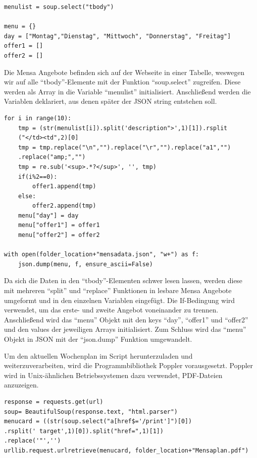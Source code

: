 \begin{lstlisting}
menulist = soup.select("tbody")

menu = {}
day = ["Montag","Dienstag", "Mittwoch", "Donnerstag", "Freitag"]
offer1 = []
offer2 = []
\end{lstlisting}

Die Mensa Angebote befinden sich auf der Webseite in einer Tabelle, weswegen wir auf alle ``tbody''-Elemente mit der Funktion ``soup.select'' zugreifen. Diese werden als Array in die Variable ``menulist'' initialisiert. Anschließend werden die Variablen deklariert, aus denen später der JSON string entstehen soll. 

\begin{lstlisting}
for i in range(10):
    tmp = (str(menulist[i]).split('description">',1)[1]).rsplit
    ("</td><td",2)[0]
    tmp = tmp.replace("\n","").replace("\r","").replace("a1","")
    .replace("amp;","")
    tmp = re.sub('<sup>.*?</sup>', '', tmp)
    if(i%2==0):
        offer1.append(tmp)
    else:
        offer2.append(tmp)
    menu["day"] = day
    menu["offer1"] = offer1
    menu["offer2"] = offer2

with open(folder_location+"mensadata.json", "w+") as f:
    json.dump(menu, f, ensure_ascii=False)
\end{lstlisting}

Da sich die Daten in den ``tbody''-Elementen schwer lesen lassen, werden diese mit mehreren ``split'' und ``replace'' Funktionen in lesbare Mensa Angebote umgeformt und in den einzelnen Variablen eingefügt. Die If-Bedingung wird verwendet, um das erste- und zweite Angebot voneinander zu trennen. Anschließend wird das ``menu'' Objekt mit den keys ``day'', ``offer1'' und ``offer2'' und den values der jeweiligen Arrays initialisiert.
Zum Schluss wird das ``menu'' Objekt in JSON mit der ``json.dump'' Funktion umgewandelt.

Um den aktuellen Wochenplan im Script herunterzuladen und weiterzuverarbeiten, wird die Programmbibliothek Poppler vorausgesetzt. Poppler wird in Unix-ähnlichen Betriebssystemen dazu verwendet, PDF-Dateien anzuzeigen.

\begin{lstlisting}
response = requests.get(url)
soup= BeautifulSoup(response.text, "html.parser")
menucard = ((str(soup.select("a[href$='/print']")[0])
.rsplit(' target',1)[0]).split("href=",1)[1])
.replace('"','')
urllib.request.urlretrieve(menucard, folder_location+"Mensaplan.pdf")
\end{lstlisting}

